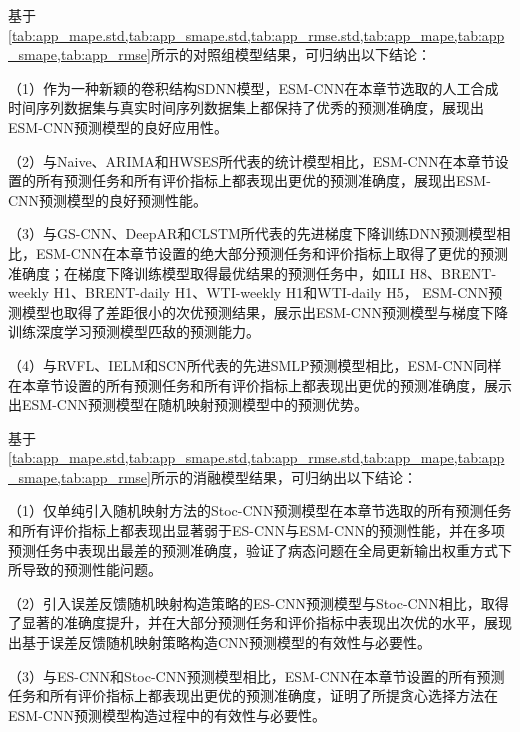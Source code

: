 


基于\cref{tab:app_mape.std,tab:app_smape.std,tab:app_rmse.std,tab:app_mape,tab:app_smape,tab:app_rmse}所示的对照组模型结果，可归纳出以下结论：

（1）作为一种新颖的卷积结构SDNN模型，ESM-CNN在本章节选取的人工合成时间序列数据集与真实时间序列数据集上都保持了优秀的预测准确度，展现出ESM-CNN预测模型的良好应用性。

（2）与Naive、ARIMA和HWSES所代表的统计模型相比，ESM-CNN在本章节设置的所有预测任务和所有评价指标上都表现出更优的预测准确度，展现出ESM-CNN预测模型的良好预测性能。

（3）与GS-CNN、DeepAR和CLSTM所代表的先进梯度下降训练DNN预测模型相比，ESM-CNN在本章节设置的绝大部分预测任务和评价指标上取得了更优的预测准确度；在梯度下降训练模型取得最优结果的预测任务中，如ILI H8、BRENT-weekly H1、BRENT-daily H1、WTI-weekly H1和WTI-daily H5， ESM-CNN预测模型也取得了差距很小的次优预测结果，展示出ESM-CNN预测模型与梯度下降训练深度学习预测模型匹敌的预测能力。

（4）与RVFL、IELM和SCN所代表的先进SMLP预测模型相比，ESM-CNN同样在本章节设置的所有预测任务和所有评价指标上都表现出更优的预测准确度，展示出ESM-CNN预测模型在随机映射预测模型中的预测优势。


基于\cref{tab:app_mape.std,tab:app_smape.std,tab:app_rmse.std,tab:app_mape,tab:app_smape,tab:app_rmse}所示的消融模型结果，可归纳出以下结论：

（1）仅单纯引入随机映射方法的Stoc-CNN预测模型在本章节选取的所有预测任务和所有评价指标上都表现出显著弱于ES-CNN与ESM-CNN的预测性能，并在多项预测任务中表现出最差的预测准确度，验证了病态问题在全局更新输出权重方式下所导致的预测性能问题。

（2）引入误差反馈随机映射构造策略的ES-CNN预测模型与Stoc-CNN相比，取得了显著的准确度提升，并在大部分预测任务和评价指标中表现出次优的水平，展现出基于误差反馈随机映射策略构造CNN预测模型的有效性与必要性。

（3）与ES-CNN和Stoc-CNN预测模型相比，ESM-CNN在本章节设置的所有预测任务和所有评价指标上都表现出更优的预测准确度，证明了所提贪心选择方法在ESM-CNN预测模型构造过程中的有效性与必要性。


